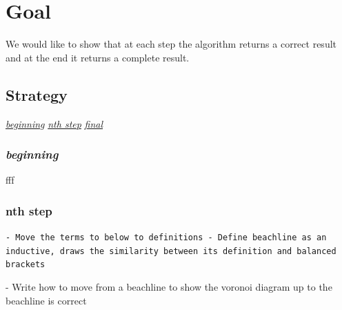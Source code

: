 \documentclass{article}
\begin{document}
\section{Goal}
We would like to show that at each step the algorithm returns a correct result and at the end it returns a complete result.
\subsection{Strategy}
\underline{{\color{gray} \textit{beginning}}} \underline{ {\color{blue} \textit{nth step}}} \underline{{\color{black} \textit{ final}}}

\subsubsection{{\color{gray} \textit{beginning}}}
fff
\subsubsection{{\color{blue} nth step}}
{\color{red} \tt - Move the terms to below to definitions \newline
\tt - Define beachline as an inductive, draws the similarity between its definition and balanced brackets \newline

- Write how to move from a beachline to show the voronoi diagram up to the beachline is correct  }
\end{document}
